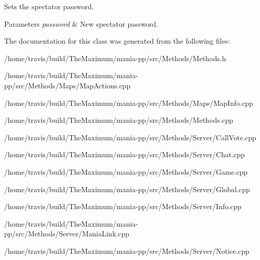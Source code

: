 Sets the spectator password. 


\begin{DoxyParams}{Parameters}
{\em password} & New spectator password. \\
\hline
\end{DoxyParams}


The documentation for this class was generated from the following files\-:\begin{DoxyCompactItemize}
\item 
/home/travis/build/\-The\-Maximum/mania-\/pp/src/\-Methods/Methods.\-h\item 
/home/travis/build/\-The\-Maximum/mania-\/pp/src/\-Methods/\-Maps/Map\-Actions.\-cpp\item 
/home/travis/build/\-The\-Maximum/mania-\/pp/src/\-Methods/\-Maps/Map\-Info.\-cpp\item 
/home/travis/build/\-The\-Maximum/mania-\/pp/src/\-Methods/Methods.\-cpp\item 
/home/travis/build/\-The\-Maximum/mania-\/pp/src/\-Methods/\-Server/Call\-Vote.\-cpp\item 
/home/travis/build/\-The\-Maximum/mania-\/pp/src/\-Methods/\-Server/Chat.\-cpp\item 
/home/travis/build/\-The\-Maximum/mania-\/pp/src/\-Methods/\-Server/Game.\-cpp\item 
/home/travis/build/\-The\-Maximum/mania-\/pp/src/\-Methods/\-Server/Global.\-cpp\item 
/home/travis/build/\-The\-Maximum/mania-\/pp/src/\-Methods/\-Server/Info.\-cpp\item 
/home/travis/build/\-The\-Maximum/mania-\/pp/src/\-Methods/\-Server/Mania\-Link.\-cpp\item 
/home/travis/build/\-The\-Maximum/mania-\/pp/src/\-Methods/\-Server/Notice.\-cpp\end{DoxyCompactItemize}
